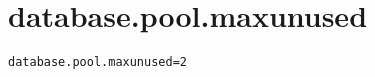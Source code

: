 \section{database.pool.maxunused}
\label{configuration:DatabasePoolMaxunused}
\AvailableInJavaOnly{\TODO}
\begin{lstlisting}[style=Props,caption={Usage example for \textit{database.pool.maxunused}}]
database.pool.maxunused=2
\end{lstlisting}